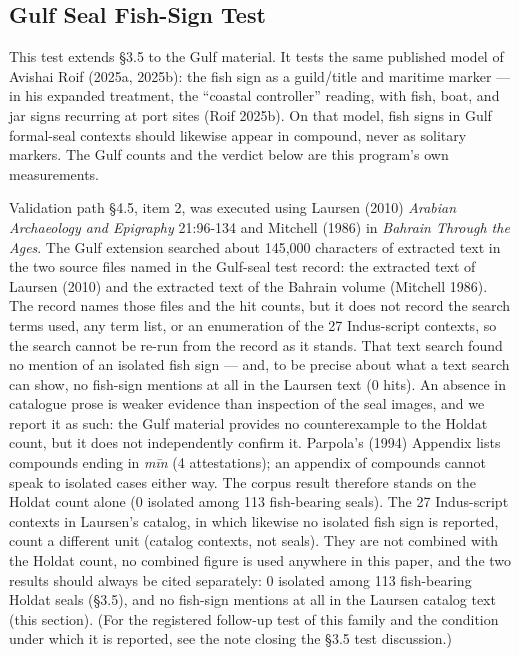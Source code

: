 \documentclass[11pt]{article}
\begin{document}
\subsection{Gulf Seal Fish-Sign Test
}\label{gulf-seal-fish-sign-test-phase-156}

This test extends \S3.5 to the Gulf material. It tests the same
published model of Avishai Roif (2025a, 2025b): the fish sign as a
guild/title and maritime marker --- in his expanded treatment, the
``coastal controller'' reading, with fish, boat, and jar signs
recurring at port sites (Roif 2025b). On that model, fish signs in
Gulf formal-seal contexts should likewise appear in compound,
never as solitary markers. The Gulf counts and the verdict below
are this program's own measurements.

Validation path §4.5, item 2, was executed using Laursen (2010) \emph{Arabian
Archaeology and Epigraphy} 21:96-134 and Mitchell (1986) in
\emph{Bahrain Through the Ages}. The Gulf extension searched about 145,000 characters of extracted text in the two source files named in the Gulf-seal test record: the extracted text of Laursen (2010) and the extracted text of the Bahrain volume (Mitchell 1986). The record names those files and the hit counts, but it does not record the search terms used, any term list, or an enumeration of the 27 Indus-script contexts, so the search cannot be re-run from the record as it stands. That text search found no mention of an isolated fish sign --- and, to be precise about what a text search can show, no fish-sign mentions at all in the Laursen text (0 hits). An absence in catalogue prose is weaker evidence than inspection of the seal images, and we report it as such: the Gulf material provides no counterexample to the Holdat count, but it does not independently confirm it. Parpola's (1994) Appendix lists compounds ending in \emph{mīn} (4 attestations); an appendix of compounds cannot speak to isolated cases either way. The corpus result therefore stands on the Holdat count alone (0 isolated among 113 fish-bearing seals). The 27 Indus-script contexts in Laursen's catalog, in which likewise no isolated fish sign is reported, count a different unit (catalog contexts, not seals). They are not combined with the Holdat count, no combined figure is used anywhere in this paper, and the two results should always be cited separately: 0 isolated among 113 fish-bearing Holdat seals (§3.5), and no fish-sign mentions at all in the Laursen catalog text (this section). (For the registered follow-up test of this family and the condition under which it is reported, see the note closing the §3.5 test discussion.)
\end{document}
